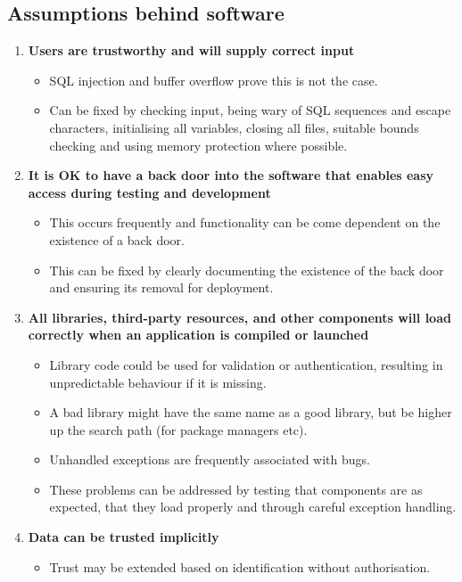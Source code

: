 \documentclass[final]{article}
\begin{document}
\subsection{Assumptions behind software}
\begin{enumerate}
	\item \textbf{Users are trustworthy and will supply correct input}
	\begin{itemize}
		\item SQL injection and buffer overflow prove this is not the case.
		\item Can be fixed by checking input, being wary of SQL sequences and escape characters, initialising all variables, closing all files, suitable bounds checking and using memory protection where possible.
	\end{itemize}
	\item \textbf{It is OK to have a back door into the software that enables easy access during testing and development}
	\begin{itemize}
		\item This occurs frequently and functionality can be come dependent on the existence of a back door.
		\item This can be fixed by clearly documenting the existence of the back door and ensuring its removal for deployment.
	\end{itemize}
	\item \textbf{All libraries, third-party resources, and other components will load correctly when an application is compiled or launched}
	\begin{itemize}
		\item Library code could be used for validation or authentication, resulting in unpredictable behaviour if it is missing.
		\item A bad library might have the same name as a good library, but be higher up the search path (for package managers etc).
		\item Unhandled exceptions are frequently associated with bugs.
		\item These problems can be addressed by testing that components are as expected, that they load properly and through careful exception handling.
	\end{itemize}
	\pagebreak
	\item \textbf{Data can be trusted implicitly}
	\begin{itemize}
		\item Trust may be extended based on identification without authorisation.

\end{itemize}
\end{enumerate}
\end{document}
